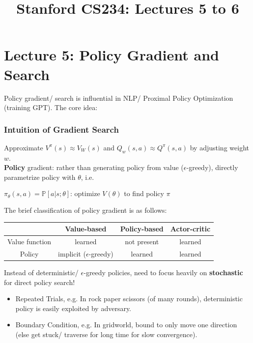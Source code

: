 \documentclass{article}
\title{Stanford CS234: Lectures 5 to 6}
\begin{document}
\section{Lecture 5: Policy Gradient and Search}
Policy gradient/ search is influential in NLP/ Proximal Policy Optimization (training GPT). The core idea:

\begin{defbox}
    \subsubsection*{Intuition of Gradient Search}
    Approximate $V^{\pi}(s) \approx V_{W}(s)$ and $Q_w(s, a) \approx Q^{\pi}(s, a)$ by adjusting weight $w$.
    \\\textbf{Policy} gradient: rather than generating policy from value ($\epsilon$-greedy), directly parametrize policy with $\theta$, i.e.
    \begin{center}
        $\pi_{\theta} (s, a) = \mathbb{P}[a | s; \theta]$: optimize $V(\theta)$ to find policy $\pi$
    \end{center}
\end{defbox}

The brief classification of policy gradient is as follows:
\begin{center}
    \begin{tabular}{|c||c|c|c|}
    \hline
      & Value-based & Policy-based & Actor-critic \\ \hline
    Value function & learned & not present & learned \\ \hline
    Policy & implicit ($\epsilon$-greedy) & learned & learned\\ \hline
    \end{tabular}
\end{center}

Instead of deterministic/ $\epsilon$-greedy policies, need to focus heavily on \textbf{stochastic} for direct policy search!
\begin{itemize}
\item Repeated Trials, e.g. In rock paper scissors (of many rounds), deterministic policy is easily exploited by adversary.
\item Boundary Condition, e.g. In gridworld, bound to only move one direction (else get stuck/ traverse for long time for slow convergence).
\end{itemize}
\end{document}
